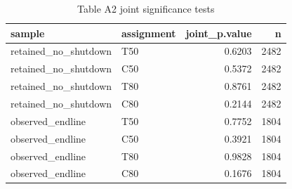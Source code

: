 \begin{table}

\caption{Table A2 joint significance tests}
\centering
\begin{tabular}[t]{llrr}
\toprule
sample & assignment & joint\_p.value & n\\
\midrule
retained\_no\_shutdown & T50 & 0.6203 & 2482\\
retained\_no\_shutdown & C50 & 0.5372 & 2482\\
retained\_no\_shutdown & T80 & 0.8761 & 2482\\
retained\_no\_shutdown & C80 & 0.2144 & 2482\\
observed\_endline & T50 & 0.7752 & 1804\\
\addlinespace
observed\_endline & C50 & 0.3921 & 1804\\
observed\_endline & T80 & 0.9828 & 1804\\
observed\_endline & C80 & 0.1676 & 1804\\
\bottomrule
\end{tabular}
\end{table}
